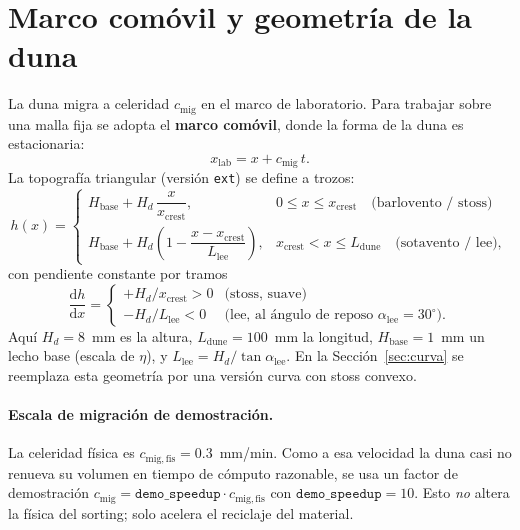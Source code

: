 \documentclass[11pt,a4paper]{article}
\newcommand{\dd}{\mathrm{d}}
\begin{document}
\section{Marco comóvil y geometría de la duna}
\label{sec:geom}
La duna migra a celeridad $c_{\mathrm{mig}}$ en el marco de laboratorio.
Para trabajar sobre una malla fija se adopta el \textbf{marco comóvil},
donde la forma de la duna es estacionaria:
\begin{equation}
    x_{\mathrm{lab}} = x + c_{\mathrm{mig}}\,t .
\end{equation}
La topografía triangular (versión \texttt{ext}) se define a trozos:
\begin{equation}
    h(x) = \begin{cases}
        H_{\mathrm{base}} + H_d\,\dfrac{x}{x_{\mathrm{crest}}}, & 0\le x \le x_{\mathrm{crest}} \quad\text{(barlovento / stoss)}\\[10pt]
        H_{\mathrm{base}} + H_d\left(1 - \dfrac{x-x_{\mathrm{crest}}}{L_{\mathrm{lee}}}\right), & x_{\mathrm{crest}} < x \le L_{\mathrm{dune}} \quad\text{(sotavento / lee)},
    \end{cases}
    \label{eq:h_tri}
\end{equation}
con pendiente constante por tramos
\begin{equation}
    \frac{\dd h}{\dd x} = \begin{cases}
        +H_d/x_{\mathrm{crest}} > 0 & \text{(stoss, suave)}\\[4pt]
        -H_d/L_{\mathrm{lee}} < 0 & \text{(lee, al ángulo de reposo }\alpha_{\mathrm{lee}}=30^\circ).
    \end{cases}
\end{equation}
Aquí $H_d=8$~mm es la altura, $L_{\mathrm{dune}}=100$~mm la longitud,
$H_{\mathrm{base}}=1$~mm un lecho base (escala de $\eta$), y
$L_{\mathrm{lee}}=H_d/\tan\alpha_{\mathrm{lee}}$. En la
Sección~\ref{sec:curva} se reemplaza esta geometría por una versión curva
con stoss convexo.

\paragraph{Escala de migración de demostración.}
La celeridad física es $c_{\mathrm{mig,fis}}=0.3$~mm/min. Como a esa
velocidad la duna casi no renueva su volumen en tiempo de cómputo
razonable, se usa un factor de demostración
$c_{\mathrm{mig}} = \texttt{demo\_speedup}\cdot c_{\mathrm{mig,fis}}$ con
$\texttt{demo\_speedup}=10$. Esto \emph{no} altera la física del sorting;
solo acelera el reciclaje del material.
\end{document}
